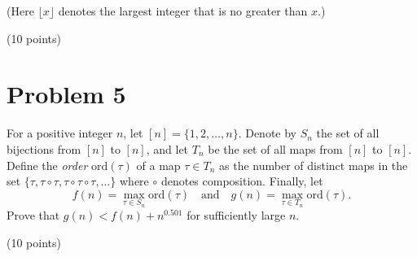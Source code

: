 \documentclass{article}
\begin{document}
(Here $\lfloor x \rfloor$ denotes the largest integer that is no greater than $x$.)

(10 points)

\section*{Problem 5}
For a positive integer $n$, let $[n] = \{1, 2, \ldots, n\}$. Denote by $S_n$ the set of all bijections from $[n]$ to $[n]$, and let $T_n$ be the set of all maps from $[n]$ to $[n]$. Define the \emph{order} $\mathrm{ord}(\tau)$ of a map $\tau \in T_n$ as the number of distinct maps in the set $\{\tau, \tau \circ \tau, \tau \circ \tau \circ \tau, \ldots\}$ where $\circ$ denotes composition. Finally, let
\[
f(n) = \max_{\tau \in S_n} \mathrm{ord}(\tau) \quad \text{and} \quad g(n) = \max_{\tau \in T_n} \mathrm{ord}(\tau).
\]
Prove that $g(n) < f(n) + n^{0.501}$ for sufficiently large $n$.

(10 points)
\end{document}
